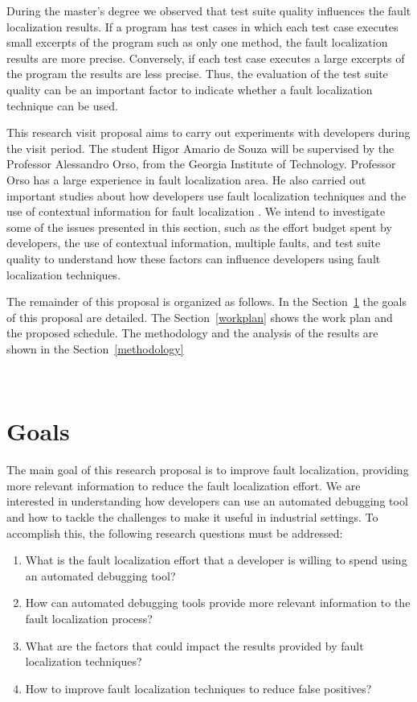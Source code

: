 \documentclass[12pt,a4paper,espaco=umemeio,noindentfirst,oneside,openany,tocpage=plain,pnumromarab,ruledheader,time,anapcustomindent]{sty/abnt}
\begin{document}
During the master's degree \cite{souza2012b} we observed that test suite quality influences the fault localization results. If a program has test cases 
in which each test case executes small excerpts of the program such as only one method, the fault localization results are more precise. Conversely, if 
each test case executes a large excerpts of the program the results are less precise. Thus, the evaluation of the test suite quality can be an important 
factor to indicate whether a fault localization technique can be used. 

This research visit proposal aims to carry out experiments with developers during the visit period. The student Higor Amario de Souza will 
be supervised by the Professor Alessandro Orso, from the Georgia Institute of Technology. Professor Orso has a large experience in fault localization 
area. He also carried out important studies about how developers use fault localization techniques \cite{parnin2011} and the use of contextual information 
for fault localization \cite{hsu2008}. We intend to investigate some of the issues presented in this section, such as the effort budget spent by 
developers, the use of contextual information, multiple faults, and test suite quality to understand how these factors can influence developers using 
fault localization techniques.

The remainder of this proposal is organized as follows. In the Section~\ref{goals} the goals of this proposal are detailed.
The Section~\ref{workplan} shows the work plan and the proposed schedule. The methodology and the analysis of the results are shown in the 
Section~\ref{methodology}

\
\section{Goals}
\label{goals}

The main goal of this research proposal is to improve fault localization, providing more relevant information to reduce the fault localization effort. 
We are interested in understanding how developers can use an automated debugging tool and how to tackle the challenges to make it useful 
in industrial settings. To accomplish this, the following research questions must be addressed:

\begin{enumerate}
 \item What is the fault localization effort that a developer is willing to spend using an automated debugging tool?
 \item How can automated debugging tools provide more relevant information to the fault localization process?
 \item What are the factors that could impact the results provided by fault localization techniques?
 \item How to improve fault localization techniques to reduce false positives?
\end{enumerate}
\end{document}
